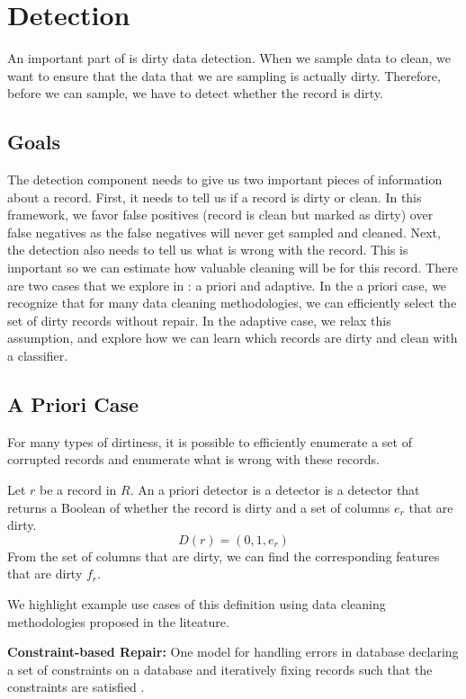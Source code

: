 \section{Detection}
An important part of \sys is dirty data detection.
When we sample data to clean, we want to ensure that the data that we are sampling is actually dirty.
Therefore, before we can sample, we have to detect whether the record is dirty.

\subsection{Goals}
The detection component needs to give us two important pieces of information about a record.
First, it needs to tell us if a record is dirty or clean.
In this framework, we favor false positives (record is clean but marked as dirty) over false negatives as the false negatives will never get sampled and cleaned.
Next, the detection also needs to tell us what is wrong with the record.
This is important so we can estimate how valuable cleaning will be for this record.
There are two cases that we explore in \sys: a priori and adaptive.
In the a priori case, we recognize that for many data cleaning methodologies, we can efficiently select the set of dirty records without repair.
In the adaptive case, we relax this assumption, and explore how we can learn which records are dirty and clean with a classifier.

\subsection{A Priori Case}
For many types of dirtiness, it is possible to efficiently enumerate a set of corrupted records and enumerate what is wrong with these records.

\begin{definition}
Let $r$ be a record in $R$. An a priori detector is a detector is a detector that returns a Boolean of whether the record is dirty and a set of columns $e_r$ that are dirty.
\[
D(r) = ({0,1}, e_r)
\]
From the set of columns that are dirty, we can find the corresponding features that are dirty $f_r$.
\end{definition}

\noindent We highlight example use cases of this definition using data cleaning methodologies proposed in the liteature.

\vspace{0.5em}

\noindent\textbf{Constraint-based Repair: }
One model for handling errors in database declaring a set of constraints on a database and 
iteratively fixing records such that the constraints are satisfied \cite{DBLP:journals/pvldb/YakoutENOI11, DBLP:journals/pvldb/FanLMTY10, khayyat2015bigdansing}.

